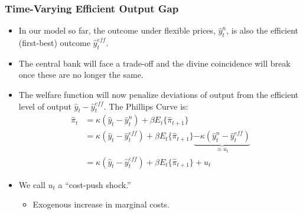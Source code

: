 \documentclass[11pt,aspectratio=169,xcolor={dvipsnames},hyperref={pdftex,pdfpagemode=UseNone,hidelinks,pdfdisplaydoctitle=true},usepdftitle=false]{beamer}
\begin{document}
\begin{frame}
\frametitle{Time-Varying Efficient Output Gap}
\begin{itemize}
	\item In our model so far, the outcome under flexible prices, $\hat{y}_t^{n}$, is also the efficient (first-best) outcome $\hat{y}_t^{eff}$.
	\item The central bank will face a trade-off and the divine coincidence will break once these are no longer the same.
	\item The welfare function will now penalize deviations of output from the efficient level of output $\hat{y}_t - \hat{y}_t^{eff}$. The Phillips Curve is:
		\begin{align*}
			\hat{\pi}_t&=\kappa (\hat{y}_t - \hat{y}_t^{n}) +\beta E_t \{\hat{\pi}_{t+1}\} \\
			&= \kappa (\hat{y}_t - \hat{y}_t^{eff}) +\beta E_t \{\hat{\pi}_{t+1}\} \underbrace{- \kappa (\hat{y}_t^{n} - \hat{y}_t^{eff})}_{\equiv u_t} \\
			&= \kappa (\hat{y}_t - \hat{y}_t^{eff}) +\beta E_t \{\hat{\pi}_{t+1}\} + u_t
		\end{align*}
 	\item We call $u_t$ a ``cost-push shock.''
 	\begin{itemize}
 		\item Exogenous increase in marginal costs.
 	\end{itemize}
\end{itemize}
\end{frame}
\end{document}
